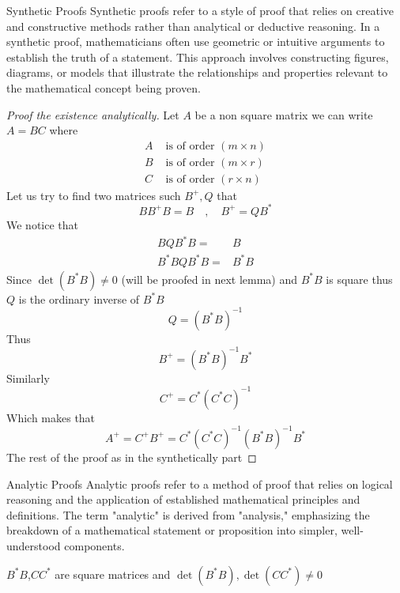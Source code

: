 \begin{enrichment*}{Synthetic Proofs}
        Synthetic proofs refer to a style of proof that relies on creative and constructive methods rather 
        than analytical or deductive reasoning. In a synthetic proof, mathematicians often use geometric or intuitive 
        arguments to establish the truth of a statement. This approach involves constructing figures, diagrams, or models that illustrate the relationships and properties relevant to the mathematical concept being proven.
\end{enrichment*}
\begin{proof}[\textcolor{theme}{Proof the existence analytically}]
        Let $A$ be a non square matrix we can write $A = BC$ where
        \begin{align*}
                A &\text{ is of order } (m\times n)
                \\
                B &\text{ is of order } (m\times r)
                \\
                C &\text{ is of order } (r\times n)
        \end{align*}
        Let us try to find two matrices such $B^{+} , Q$ that 
        \[
        BB^{+} B = B \quad,\quad B^{+} = QB^*
        \]
        We notice that 
        \begin{align*}
                BQB^{*}B =& B 
                \\
                B^{*}BQB^{*}B =& B^{*}B
        \end{align*}
        Since $\det(B^{*}B) \neq 0$ (will be proofed in next lemma) and $B^{*}B$ is square thus $Q$ is the ordinary inverse of $B^{*}B$
        \[
        Q = {(B^{*}B)}^{-1}
        \]
        Thus 
        \[
        B^{+} = {(B^{*}B)}^{-1}B^*  
        \]
        Similarly
        \[
        C^{+} = C^*{(C^{*}C)}^{-1}
        \]
        Which makes that 
        \[
        A^{+}  = C^{+}B^{+}= C^*{(C^{*}C)}^{-1}{(B^{*}B)}^{-1}B^*
        \]
        The rest of the proof as in the synthetically part 
\end{proof}
\begin{enrichment*}{Analytic Proofs}
        Analytic proofs refer to a method of proof that relies on logical reasoning and the application of established mathematical principles and definitions. The term "analytic" is derived from "analysis," emphasizing the breakdown of a mathematical statement or proposition into simpler, well-understood components.
\end{enrichment*}
\newpage
\begin{lemma}
        $B^{*}B$,$CC^{*}$ are square matrices and $\det(B^{*}B) ,\det(CC^{*}) \neq 0 $
\end{lemma}
